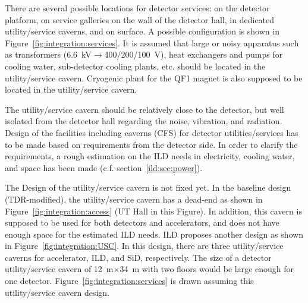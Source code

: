 There are several possible locations for detector services: on the detector platform, on service galleries on the wall of the detector hall, in dedicated utility/service caverns, and on surface. A possible configuration is shown in Figure~\ref{fig:integration:services}.
It is assumed that large or noisy apparatus such as transformers (6.6~kV$\rightarrow$400/200/100~V), heat exchangers and pumps for cooling water, sub-detector cooling plants, etc. should be located in the utility/service cavern. Cryogenic plant for the QF1 magnet is also supposed to be located in the utility/service cavern.

The utility/service cavern should be relatively close to the detector, but well isolated from the detector hall  regarding the noise, vibration, and radiation. Design of the facilities including caverns (CFS) for detector utilities/services has to be made based on requirements from the detector side. In order to clarify the requirements, a rough estimation on the ILD needs in electricity, cooling water, and space has been made (c.f. section~\ref{ild:sec:power}). 

The Design of the utility/service cavern is not fixed yet. In the baseline design (TDR-modified), the utility/service cavern has a dead-end as shown in Figure~\ref{fig:integration:access} (UT Hall in this Figure). In addition, this cavern is supposed to be used for both detectors and accelerators, and does not have enough space for the estimated ILD needs. 
ILD proposes another design as shown in Figure~\ref{fig:integration:USC}. In this design, there are three utility/service caverns for accelerator, ILD, and SiD, respectively. The size of a detector utility/service cavern of 12~m$\times$34~m with two floors would be large enough for one detector. Figure~\ref{fig:integration:services} is drawn assuming this utility/service cavern design.

